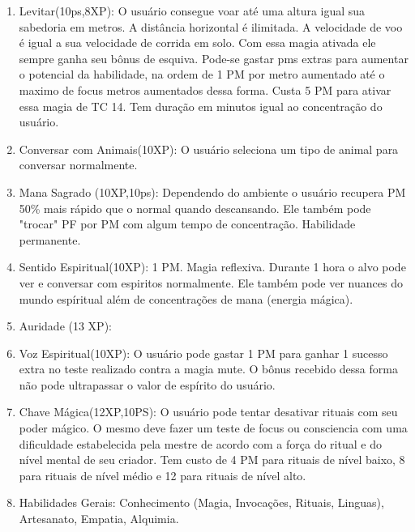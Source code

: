 \begin{enumerate}
\item Levitar(10ps,8XP): O usuário consegue voar até uma altura igual sua sabedoria em metros. A distância horizontal é ilimitada. A velocidade de voo é igual a sua velocidade de corrida em solo. Com essa magia ativada ele sempre ganha seu bônus de esquiva. Pode-se gastar pms extras para aumentar o potencial da habilidade, na ordem de 1 PM por metro aumentado até o maximo de focus metros aumentados dessa forma. Custa 5 PM para ativar essa magia de TC 14. Tem duração em minutos igual ao concentração do usuário.
 	
 	 	\item Conversar com Animais(10XP): O usuário seleciona um tipo de animal para conversar normalmente. 
  
  	  
	 	\item Mana Sagrado (10XP,10ps): Dependendo do ambiente o usuário recupera PM 50\% mais rápido que o normal quando descansando. Ele também pode "trocar" PF por PM com algum tempo de concentração. Habilidade permanente.  
  	
	 	\item Sentido Espiritual(10XP): 1 PM. Magia reflexiva.\newline
Durante 1 hora o alvo pode ver e conversar com espiritos normalmente. Ele também pode ver nuances do mundo espíritual além de concentrações de mana (energia mágica). 
  
	\item Auridade (13 XP): %
		
	\item  Voz Espiritual(10XP): O usuário pode gastar 1 PM para ganhar 1 sucesso extra no teste realizado contra a magia mute. O bônus recebido dessa forma não pode ultrapassar o valor de espírito do usuário.

	\item  Chave Mágica(12XP,10PS): O usuário pode tentar desativar rituais com seu poder mágico. O mesmo deve fazer um teste de focus ou consciencia com uma dificuldade estabelecida pela mestre de acordo com a força do ritual e do nível mental de seu criador. Tem custo de 4 PM para rituais de nível baixo, 8 para rituais de nível médio e 12 para rituais de nível alto.

  \item Habilidades Gerais: Conhecimento (Magia, Invocações, Rituais, Linguas), Artesanato, Empatia, Alquimia.

\end{enumerate}


